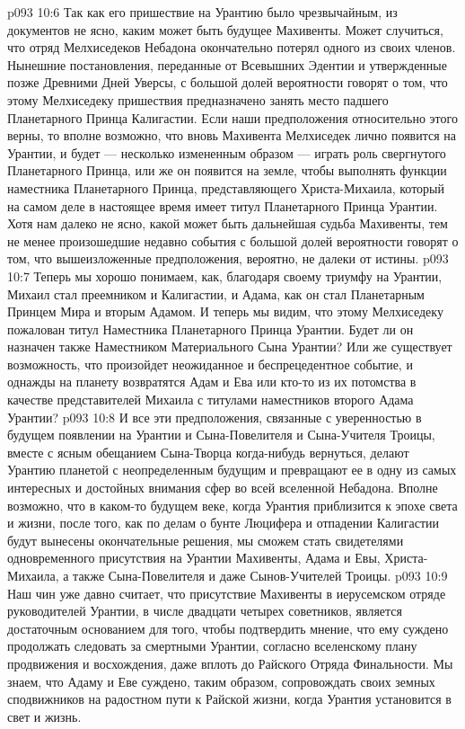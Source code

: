 \vs p093 10:6 Так как его пришествие на Урантию было чрезвычайным, из документов не ясно, каким может быть будущее Махивенты. Может случиться, что отряд Мелхиседеков Небадона окончательно потерял одного из своих членов. Нынешние постановления, переданные от Всевышних Эдентии и утвержденные позже Древними Дней Уверсы, с большой долей вероятности говорят о том, что этому Мелхиседеку пришествия предназначено занять место падшего Планетарного Принца Калигастии. Если наши предположения относительно этого верны, то вполне возможно, что вновь Махивента Мелхиседек лично появится на Урантии, и будет --- несколько измененным образом --- играть роль свергнутого Планетарного Принца, или же он появится на земле, чтобы выполнять функции наместника Планетарного Принца, представляющего Христа\hyp{}Михаила, который на самом деле в настоящее время имеет титул Планетарного Принца Урантии. Хотя нам далеко не ясно, какой может быть дальнейшая судьба Махивенты, тем не менее произошедшие недавно события с большой долей вероятности говорят о том, что вышеизложенные предположения, вероятно, не далеки от истины.
\vs p093 10:7 Теперь мы хорошо понимаем, как, благодаря своему триумфу на Урантии, Михаил стал преемником и Калигастии, и Адама, как он стал Планетарным Принцем Мира и вторым Адамом. И теперь мы видим, что этому Мелхиседеку пожалован титул Наместника Планетарного Принца Урантии. Будет ли он назначен также Наместником Материального Сына Урантии? Или же существует возможность, что произойдет неожиданное и беспрецедентное событие, и однажды на планету возвратятся Адам и Ева или кто\hyp{}то из их потомства в качестве представителей Михаила с титулами наместников второго Адама Урантии?
\vs p093 10:8 И все эти предположения, связанные с уверенностью в будущем появлении на Урантии и Сына\hyp{}Повелителя и Сына\hyp{}Учителя Троицы, вместе с ясным обещанием Сына\hyp{}Творца когда\hyp{}нибудь вернуться, делают Урантию планетой с неопределенным будущим и превращают ее в одну из самых интересных и достойных внимания сфер во всей вселенной Небадона. Вполне возможно, что в каком\hyp{}то будущем веке, когда Урантия приблизится к эпохе света и жизни, после того, как по делам о бунте Люцифера и отпадении Калигастии будут вынесены окончательные решения, мы сможем стать свидетелями одновременного присутствия на Урантии Махивенты, Адама и Евы, Христа\hyp{}Михаила, а также Сына\hyp{}Повелителя и даже Сынов\hyp{}Учителей Троицы.
\vs p093 10:9 Наш чин уже давно считает, что присутствие Махивенты в иерусемском отряде руководителей Урантии, в числе двадцати четырех советников, является достаточным основанием для того, чтобы подтвердить мнение, что ему суждено продолжать следовать за смертными Урантии, согласно вселенскому плану продвижения и восхождения, даже вплоть до Райского Отряда Финальности. Мы знаем, что Адаму и Еве суждено, таким образом, сопровождать своих земных сподвижников на радостном пути к Райской жизни, когда Урантия установится в свет и жизнь.
